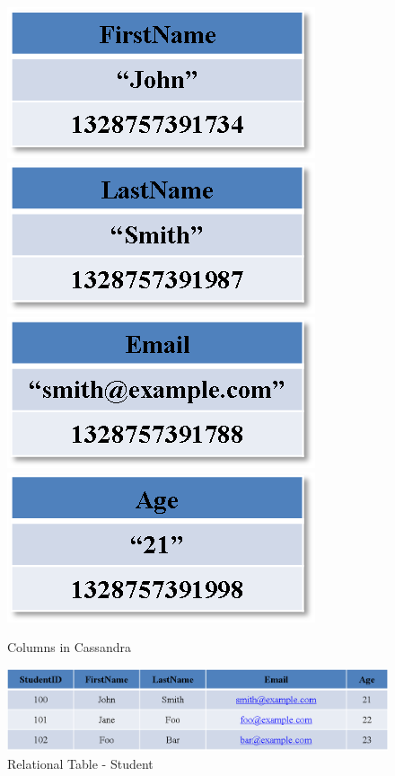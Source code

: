 \begin{figure}[H]
	\newcommand{\W}{.24\textwidth}
	\centering
	\includegraphics[width=\W]{./figure/Example/Column_FirstName.png}
	\includegraphics[width=\W]{./figure/Example/Column_LastName.png}
	\includegraphics[width=\W]{./figure/Example/Column_Email.png}
	\includegraphics[width=\W]{./figure/Example/Column_Age.png}
	\caption{Columns in Cassandra}\label{f:column-FirstName}
\end{figure}

\begin{figure}[H]
	\centering
	\includegraphics[width=1\textwidth]{./figure/Example/RelationalTable_User.png}
	\caption{Relational Table - Student}\label{f:RDB-User}
\end{figure}

